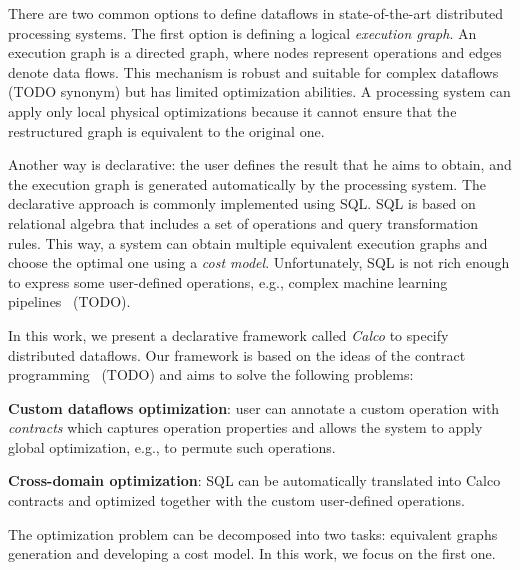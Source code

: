There are two common options to define dataflows in state-of-the-art distributed processing systems.
The first option is defining a logical {\em execution graph}.
An execution graph is a directed graph, where nodes represent operations and edges denote data flows.
This mechanism is robust and suitable for complex dataflows (TODO synonym) but has limited optimization abilities.
A processing system can apply only local physical optimizations because it cannot ensure that the restructured graph is equivalent to the original one.

Another way is declarative: the user defines the result that he aims to obtain, and the execution graph is generated automatically by the processing system.
The declarative approach is commonly implemented using SQL.
SQL is based on relational algebra that includes a set of operations and query transformation rules.
This way, a system can obtain multiple equivalent execution graphs and choose the optimal one using a {\em cost model}.
Unfortunately, SQL is not rich enough to express some user-defined operations, e.g., complex machine learning pipelines~\cite{PROOF} (TODO).

In this work, we present a declarative framework called {\em Calco} to specify distributed dataflows.
Our framework is based on the ideas of the contract programming~\cite{REF} (TODO) and aims to solve the following problems:

{\bf Custom dataflows optimization}: user can annotate a custom operation with {\em contracts} which captures operation properties and allows the system to apply global optimization, e.g., to permute such operations.

{\bf Cross-domain optimization}: SQL can be automatically translated into Calco contracts and optimized together with the custom user-defined operations.

The optimization problem can be decomposed into two tasks: equivalent graphs generation and developing a cost model.
In this work, we focus on the first one.
